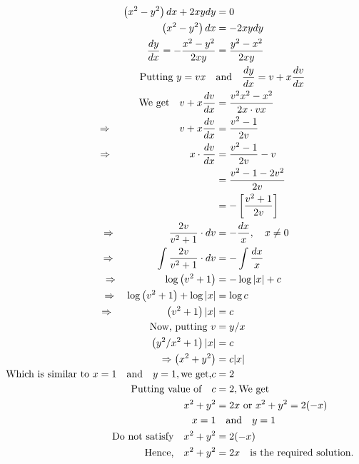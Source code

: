 \begin{answer}

	\begin{alignat*}{2}
		\left(x^{2}-y^{2}\right) d x+2 x y d y&=0\\
			\left(x^{2}-y^{2}\right) d x&=-2 x y d y \\
			\frac{d y}{d x}=-\frac{x^{2}-y^{2}}{2 x y}&=\frac{y^{2}-x^{2}}{2 x y}\\
			\text{Putting  } y=v x  \quad &\text{and} \quad \frac{d y}{d x}=v+x \frac{d v}{d x}\\
			\text{ We get}
			\quad v+x \frac{d v}{d x}&=\frac{v^{2} x^{2}-x^{2}}{2 x \cdot v x}\\
			\Rightarrow \hspace{2cm}\quad v+x \frac{d v}{d x}&=\frac{v^{2}-1}{2 v}\\
			\Rightarrow\hspace{2.7cm} x \cdot \frac{d v}{d x}&=\frac{v^{2}-1}{2 v}-v\\&=\frac{v^{2}-1-2 v^{2}}{2 v}\\&=-\left[\frac{v^{2}+1}{2 v}\right]\\
			\Rightarrow \hspace{1.5cm}\quad \frac{2 v}{v^{2}+1} \cdot d v&=-\frac{d x}{x}, \quad x \neq 0\\
			\Rightarrow \hspace{1.1cm}\quad \int \frac{2 v}{v^{2}+1} \cdot d v&=-\int \frac{d x}{x}\\
			\Rightarrow \hspace{1.3cm}\quad \log \left(v^{2}+1\right)&=-\log |x|+c\\
			\Rightarrow \quad \log \left(v^{2}+1\right)+\log |x|&=\log c\\
			\Rightarrow \hspace{1.5cm}\quad\left(v^{2}+1\right)|x|&=c\\
			\text{Now, putting }v&=y / x\\
			\left(y^{2} / x^{2}+1\right)|x|&=c \\
			\Rightarrow \left(x^{2}+y^{2}\right)&=c|x|\\\text{	Which is similar to } x=1 \quad \text{and} \quad y=1, \text{we get,}c&=2\\\text{Putting value of} \quad c&=2 ,\text{We get}\\x^{2}+y^{2}&=2 x \text { or } x^{2}+y^{2}=2(-x)\\x=1 &\quad \text{and}\quad y=1 \\\text{Do not satisfy}\quad x^{2}+y^{2}&=2(-x) \\\text{Hence,}\quad x^{2}+y^{2}&=2 x \quad \text{is the required solution.}
	\end{alignat*}
\end{answer}

